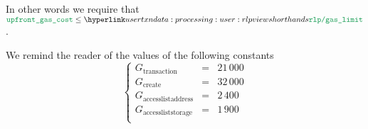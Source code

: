	\saNote{}
	In other words we require that
	$\locUpfrontGasCost \leq \locRlpGasLimit$.

	\saNote{}
	We remind the reader of the values of the following constants
	\[
		\left\{ \begin{array}{lcr}
			G_\text{transaction}       & \!\!\! = \!\!\! & 21\,000 \\
			G_\text{create}            & \!\!\! = \!\!\! & 32\,000 \\
			G_\text{accesslistaddress} & \!\!\! = \!\!\! & 2\,400  \\
			G_\text{accessliststorage} & \!\!\! = \!\!\! & 1\,900  \\
		\end{array} \right.
	\]
